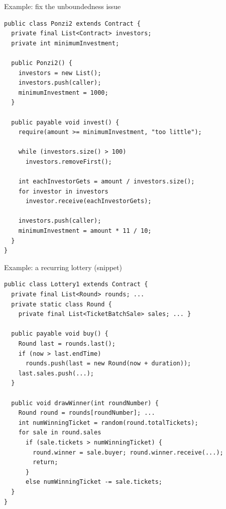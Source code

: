 \documentclass[11pt]{beamer}  %
\begin{document}
\begin{frame}[fragile]{Example: fix the unboundedness issue}

  \vspace*{-1.5ex}
  \begin{center}
    \begin{minipage}{0.95\textwidth}
      \begin{lstlisting}[language=pseudo]
public class Ponzi2 extends Contract {
  private final List<Contract> investors;
  private int minimumInvestment;

  public Ponzi2() {
    investors = new List();
    investors.push(caller);
    minimumInvestment = 1000;
  }

  public payable void invest() {
    require(amount >= minimumInvestment, "too little");

    while (investors.size() > 100)
      investors.removeFirst();

    int eachInvestorGets = amount / investors.size();
    for investor in investors
      investor.receive(eachInvestorGets);

    investors.push(caller);
    minimumInvestment = amount * 11 / 10;
  }
}
      \end{lstlisting}
    \end{minipage}
  \end{center}
  
\end{frame}

\begin{frame}[fragile]{Example: a recurring lottery (snippet)}

  \begin{center}
    \begin{minipage}{0.95\textwidth}
      \begin{lstlisting}[language=pseudo,numbers=none]
public class Lottery1 extends Contract {
  private final List<Round> rounds; ...
  private static class Round {
    private final List<TicketBatchSale> sales; ... }

  public payable void buy() {
    Round last = rounds.last();
    if (now > last.endTime)
      rounds.push(last = new Round(now + duration));
    last.sales.push(...);
  }

  public void drawWinner(int roundNumber) {
    Round round = rounds[roundNumber]; ...
    int numWinningTicket = random(round.totalTickets);
    for sale in round.sales
      if (sale.tickets > numWinningTicket) {
        round.winner = sale.buyer; round.winner.receive(...);
        return;
      }
      else numWinningTicket -= sale.tickets;
  }
}
      \end{lstlisting}
    \end{minipage}
  \end{center}
  
\end{frame}
\end{document}
